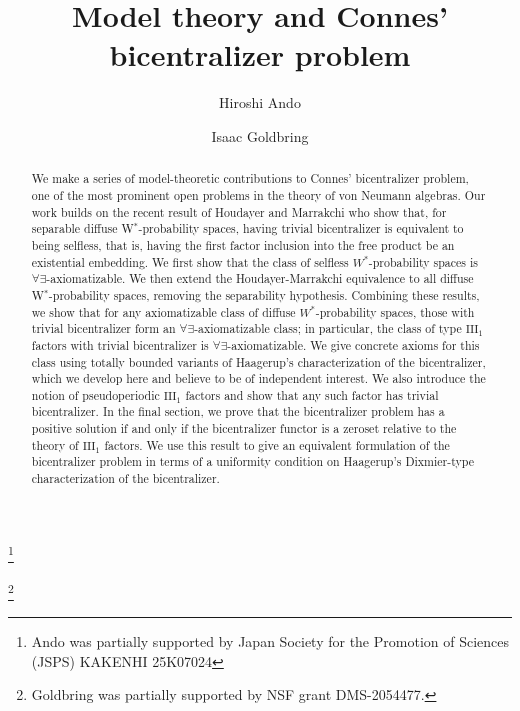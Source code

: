 \documentclass[12pt]{amsart}
\theoremstyle{definition}
\begin{document}

\title{Model theory and Connes' bicentralizer problem}


\author{Hiroshi Ando}
\address{Department of Mathematics and Informatics, Chiba University, 1-33 Yayoi-cho, Inage, Chiba
263-8522, Japan}
\thanks{Ando was partially supported by 
Japan Society for the Promotion of Sciences (JSPS) KAKENHI 	25K07024}
\author{Isaac Goldbring}
\address{Department of Mathematics\\University of California, Irvine, 340 Rowland Hall (Bldg.\# 400),
Irvine, CA 92697-3875}
\thanks{Goldbring was partially supported by NSF grant DMS-2054477.}

\begin{abstract}
We make a series of model-theoretic contributions to Connes' bicentralizer problem, one of the most prominent open problems in the theory of von Neumann algebras. Our work builds on the recent result of Houdayer and Marrakchi who show that, for separable diffuse W$^*$-probability spaces, having trivial bicentralizer is equivalent to being selfless, that is, having the first factor inclusion into the free product be an existential embedding. We first show that the class of selfless $W^*$-probability spaces is $\forall\exists$-axiomatizable.  We then extend the Houdayer-Marrakchi equivalence to all diffuse W$^*$-probability spaces, removing the separability hypothesis. Combining these results, we show that for any axiomatizable class of diffuse $W^*$-probability spaces, those with trivial bicentralizer form an $\forall\exists$-axiomatizable class; in particular, the class of type $\mathrm{III}_1$ factors with trivial bicentralizer is $\forall\exists$-axiomatizable. We give concrete axioms for this class using totally bounded variants of Haagerup's characterization of the bicentralizer, which we develop here and believe to be of independent interest. We also introduce the notion of pseudoperiodic $\mathrm{III}_1$ factors and show that any such factor has trivial bicentralizer.  In the final section, we prove that the bicentralizer problem has a positive solution if and only if the bicentralizer functor is a zeroset relative to the theory of $\mathrm{III}_1$ factors. We use this result to give an equivalent formulation of the bicentralizer problem in terms of a uniformity condition on Haagerup's Dixmier-type characterization of the bicentralizer.
\end{abstract}
\end{document}
